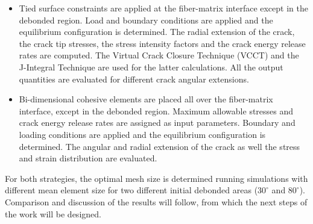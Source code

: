 \documentclass
[
a4paper,                      %
twoside,					  %
12pt,                         %
abstract,		      %
fleqn,                        %
]
{scrartcl} %
\begin{document}
\begin{itemize}
\item Tied surface constraints are applied at the fiber-matrix interface except in the debonded region. Load and boundary conditions are applied and the equilibrium configuration is determined. The radial extension of the crack, the crack tip stresses, the stress intensity factors and the crack energy release rates are computed. The Virtual Crack Closure Technique (VCCT) and the J-Integral Technique are used for the latter calculations. All the output quantities are evaluated for different crack angular extensions.
\item Bi-dimensional cohesive elements are placed all over the fiber-matrix interface, except in the debonded region. Maximum allowable stresses and crack energy release rates are assigned as input parameters. Boundary and loading conditions are applied and the equilibrium configuration is determined. The angular and radial extension of the crack as well the stress and strain distribution are evaluated.
\end{itemize}

For both strategies, the optimal mesh size is determined running simulations with different mean element size for two different initial debonded areas ($30^{\circ}$ and $80^{\circ}$).\\
Comparison and discussion of the results will follow, from which the next steps of the work will be designed.







\end{document}
